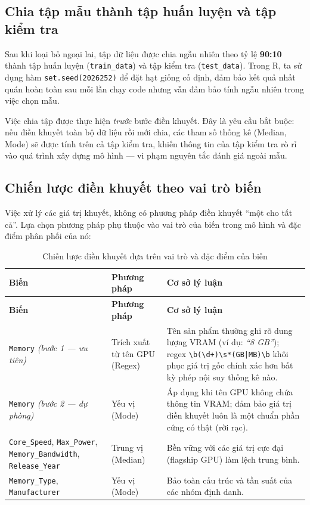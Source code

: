 \subsection{Chia tập mẫu thành tập huấn luyện và tập kiểm tra}

Sau khi loại bỏ ngoại lai, tập dữ liệu được chia ngẫu nhiên theo tỷ lệ \textbf{90:10} thành tập huấn luyện (\texttt{train\_data}) và tập kiểm tra (\texttt{test\_data}). Trong R, ta sử dụng hàm \texttt{set.seed(2026252)} để đặt hạt giống cố định, đảm bảo kết quả nhất quán hoàn toàn sau mỗi lần chạy code nhưng vẫn đảm bảo tính ngẫu nhiên trong việc chọn mẫu.

Việc chia tập được thực hiện \emph{trước} bước điền khuyết. Đây là yêu cầu bắt buộc: nếu điền khuyết toàn bộ dữ liệu rồi mới chia, các tham số thống kê (Median, Mode) sẽ được tính trên cả tập kiểm tra, khiến thông tin của tập kiểm tra rò rỉ vào quá trình xây dựng mô hình --- vi phạm nguyên tắc đánh giá ngoài mẫu.

\subsection{Chiến lược điền khuyết theo vai trò biến}

Việc xử lý các giá trị khuyết, không có phương pháp điền khuyết ``một cho tất cả''. Lựa chọn phương pháp phụ thuộc vào vai trò của biến trong mô hình và đặc điểm phân phối của nó:

\renewcommand{\arraystretch}{1.2}
\small
\setlength\LTleft{\fill}
\setlength\LTright{\fill}
\begin{longtable}{|p{4.5cm}|p{3.2cm}|p{6.5cm}|}
\caption{Chiến lược điền khuyết dựa trên vai trò và đặc điểm của biến}
\label{tab:imputation_strategy} \\
\hline
\textbf{Biến} & \textbf{Phương pháp} & \textbf{Cơ sở lý luận} \\
\hline
\endfirsthead
\hline
\textbf{Biến} & \textbf{Phương pháp} & \textbf{Cơ sở lý luận} \\
\hline
\endhead
\hline
\endlastfoot
\texttt{Memory} \newline \textit{(bước 1 --- ưu tiên)} & Trích xuất từ tên GPU (Regex) & Tên sản phẩm thường ghi rõ dung lượng VRAM (ví dụ: \textit{``8 GB''}); regex \texttt{\textbackslash b(\textbackslash d+)\textbackslash s*(GB|MB)\textbackslash b} khôi phục giá trị gốc chính xác hơn bất kỳ phép nội suy thống kê nào. \\
\hline
\texttt{Memory} \newline \textit{(bước 2 --- dự phòng)} & Yếu vị (Mode) & Áp dụng khi tên GPU không chứa thông tin VRAM; đảm bảo giá trị điền khuyết luôn là một chuẩn phần cứng có thật (rời rạc). \\
\hline
\texttt{Core\_Speed}, \texttt{Max\_Power}, \texttt{Memory\_Bandwidth}, \texttt{Release\_Year} & Trung vị (Median) & Bền vững với các giá trị cực đại (flagship GPU) làm lệch trung bình. \\
\hline
\texttt{Memory\_Type}, \texttt{Manufacturer} & Yếu vị (Mode) & Bảo toàn cấu trúc và tần suất của các nhóm định danh. \\
\hline
\end{longtable}
\normalsize

